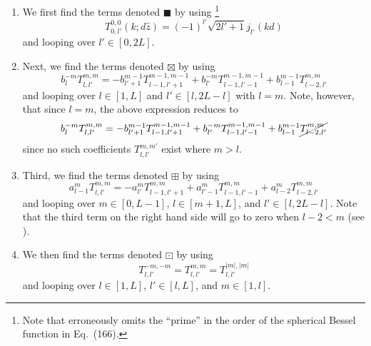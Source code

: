 \begin{enumerate}

\item We first find the terms denoted $\blacksquare$ by using \citep[Eq.~(166)]{Zotter2009PhD}%
\footnote{Note that \citet{Zotter2009PhD} erroneously omits the ``prime'' in the order of the spherical Bessel function in Eq.~(166).}
\begin{equation}\label{eq:A1_Navigation_Filters:z_Translation_Initial}
T_{0,l'}^{0,0}(k; d \hat{z}) = (-1)^{l'} \sqrt{2l' + 1} j_{l'}(k d)
\end{equation} %
and looping over $l' \in [0,2L]$.

\item Next, we find the terms denoted $\boxtimes$ by using \citep[Eq.~(163b)]{Zotter2009PhD}
\begin{equation}\label{eq:A1_Navigation_Filters:z_Translation_Recurrence_b}
b_l^{-m} T_{l,l'}^{m,m} = -b_{l'+1}^{m-1} T_{l-1,l'+1}^{m-1,m-1} + b_{l'}^{-m} T_{l-1,l'-1}^{m-1,m-1} + b_{l-1}^{m-1} T_{l-2,l'}^{m,m}
\end{equation}
and looping over $l \in [1,L]$ and $l' \in [l,2L - l]$ with $l = m$.
Note, however, that since $l = m$, the above expression reduces to
\begin{equation}
b_l^{-m} T_{l,l'}^{m,m} = -b_{l'+1}^{m-1} T_{l-1,l'+1}^{m-1,m-1} + b_{l'}^{-m} T_{l-1,l'-1}^{m-1,m-1} + b_{l-1}^{m-1} \cancel{T_{l-2,l'}^{m,m}}
\end{equation} %
since no such coefficients $T_{l,l'}^{m,m'}$ exist where $m > l$.

\item Third, we find the terms denoted $\boxplus$ by using \citep[Eq.~(163a)]{Zotter2009PhD}
\begin{equation}\label{eq:A1_Navigation_Filters:z_Translation_Recurrence_a}
a_{l-1}^m T_{l,l'}^{m,m} = -a_{l'}^m T_{l-1,l'+1}^{m,m} + a_{l'-1}^m T_{l-1,l'-1}^{m,m} + a_{l-2}^m T_{l-2,l'}^{m,m}
\end{equation} %
and looping over $m \in [0,L - 1]$, $l \in [m + 1,L]$, and $l' \in [l,2L - l]$.
Note that the third term on the right hand side will go to zero when $l - 2 < m$ (see ).

\item We then find the terms denoted $\boxdot$ by using \citep[Eq.~(161)]{Zotter2009PhD}
\begin{equation}\label{eq:A1_Navigation_Filters:z_Translation_m_Symmetry}
T_{l,l'}^{-m,-m} = T_{l,l'}^{m,m} = T_{l,l'}^{|m|,|m|}
\end{equation} %
and looping over $l \in [1,L]$, $l' \in [l,L]$, and $m \in [1,l]$.


\end{enumerate}
